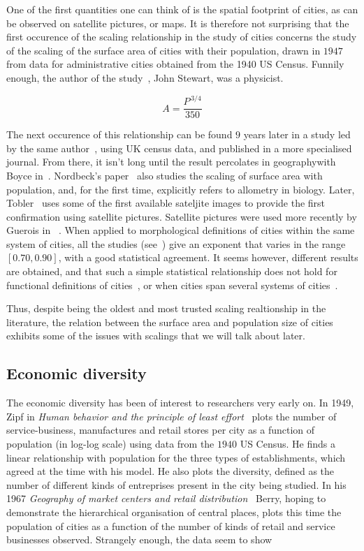 One of the first quantities one can think of is the spatial footprint of cities,
as can be observed on satellite pictures, or maps. It is therefore not
surprising that the first occurence of the scaling relationship in the study of
cities concerns the study of the scaling of the surface area of cities with
their population, drawn in $1947$ from data for administrative cities obtained
from the 1940 US Census.  Funnily enough, the author of the
study~\cite{Stewart:1947}, John Stewart, was a physicist.

\begin{equation}
    A = \frac{P^{\,3/4}}{350}
\end{equation}

The next occurence of this relationship can be found $9$ years later in a study
led by the same author~\cite{Stewart:1958}, using UK census data, and published
in a more specialised journal. From there, it isn't long until the result
percolates in geographywith Boyce in~\cite{Boyce:1963}.  Nordbeck's
paper~\cite{Nordbeck:1965} also studies the scaling of surface area with
population, and, for the first time, explicitly refers to allometry in biology.
Later, Tobler~\cite{Tobler:1969} uses some of the first available sateljite
images to provide the first confirmation using satellite pictures. Satellite
pictures were used more recently by Guerois in ~\cite{Guerois:2003}. When
applied to morphological definitions of cities within the same system of cities,
all the studies (see~\cite{Batty:2011}) give an exponent that varies in the
range $[0.70, 0.90]$, with a good statistical agreement. It seems however,
different results are obtained, and that such a simple statistical relationship
does not hold for functional definitions of cities~\cite{Batty:2011}, or when
cities span several systems of cities~\cite{Fuller:2009}.

Thus, despite being the oldest and most trusted scaling realtionship in the
literature, the relation between the surface area and population size of cities
exhibits some of the issues with scalings that we will talk about later.

\subsection{Economic diversity}
\label{sub:economic_diversity}

The economic diversity has been of interest to researchers very early on. In
1949, Zipf in \emph{Human behavior and the principle of least
effort}~\cite{Zipf:1949} plots the number of service-business, manufactures and
retail stores per city as a function of population (in log-log scale) using data
from the $1940$ US Census. He finds a linear relationship with population for
the three types of establishments, which agreed at the time with his model. He
also plots the diversity, defined as the number of different kinds of
entreprises present in the city being studied. In his 1967 \emph{Geography of
market centers and retail distribution}~\cite{Berry:1967} Berry, hoping to
demonstrate the hierarchical organisation of central places, plots this time
the population of cities as a function of the number of kinds of retail and
service businesses observed. Strangely enough, the data seem to show

